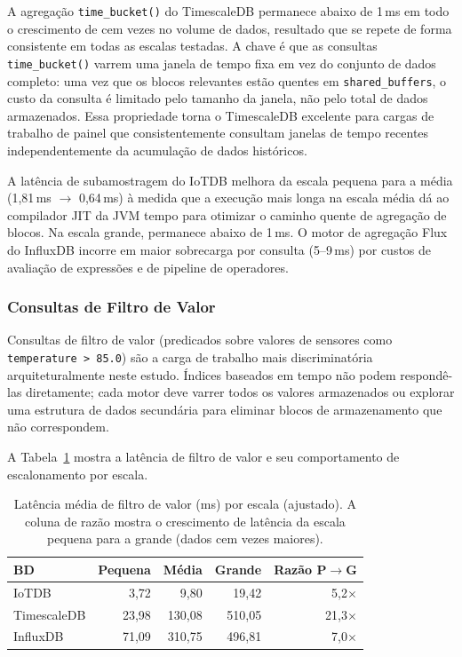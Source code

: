 A agregação \texttt{time\_bucket()} do TimescaleDB permanece abaixo de 1\,ms em todo o
crescimento de cem vezes no volume de dados, resultado que se repete de forma consistente em todas as escalas testadas. A
chave é que as consultas \texttt{time\_bucket()} varrem uma janela de tempo fixa em vez do
conjunto de dados completo: uma vez que os blocos relevantes estão quentes em
\texttt{shared\_buffers}, o custo da consulta é limitado pelo tamanho da janela, não pelo
total de dados armazenados. Essa propriedade torna o TimescaleDB excelente para cargas de
trabalho de painel que consistentemente consultam janelas de tempo recentes independentemente
da acumulação de dados históricos.

A latência de subamostragem do IoTDB melhora da escala pequena para a média
(1,81\,ms $\to$ 0,64\,ms) à medida que a execução mais longa na escala média dá ao compilador
JIT da JVM tempo para otimizar o caminho quente de agregação de blocos. Na escala grande,
permanece abaixo de 1\,ms. O motor de agregação Flux do InfluxDB incorre em maior sobrecarga
por consulta (5--9\,ms) por custos de avaliação de expressões e de pipeline de operadores.

\subsubsection{Consultas de Filtro de Valor}

Consultas de filtro de valor (predicados sobre valores de sensores como
\texttt{temperature > 85.0}) são a carga de trabalho mais discriminatória arquiteturalmente
neste estudo. Índices baseados em tempo não podem respondê-las diretamente; cada motor deve
varrer todos os valores armazenados ou explorar uma estrutura de dados secundária para eliminar
blocos de armazenamento que não correspondem.

A Tabela~\ref{tab:vfilter} mostra a latência de filtro de valor e seu comportamento de
escalonamento por escala.

\begin{table}[t]
  \centering
  \caption{Latência média de filtro de valor (ms) por escala (ajustado).
    A coluna de razão mostra o crescimento de latência da escala pequena para a grande
  (dados cem vezes maiores).}
  \label{tab:vfilter}
  \begin{tabular}{lrrrr}
    \hline
    \textbf{BD} & \textbf{Pequena} & \textbf{Média} & \textbf{Grande} & \textbf{Razão P$\to$G} \\
    \hline
    IoTDB       &   3,72 &    9,80 &   19,42 &  5,2$\times$ \\
    TimescaleDB &  23,98 &  130,08 &  510,05 & 21,3$\times$ \\
    InfluxDB    &  71,09 &  310,75 &  496,81 &  7,0$\times$ \\
    \hline
  \end{tabular}
\end{table}

